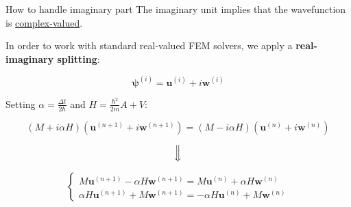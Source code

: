 \begin{frame}{How to handle imaginary part}
    The imaginary unit implies that the wavefunction is \underline{complex-valued}.

    \pause

    In order to work with standard real-valued FEM solvers, we apply a \textcolor{BrickRed}{\textbf{real-imaginary splitting}}:

    \begin{equation*}
        \boldsymbol{\psi}^{(i)}=\boldsymbol{u}^{(i)}+i\boldsymbol{w}^{(i)}
    \end{equation*}

    \pause

    Setting $\alpha=\frac{\Delta t}{2\hbar}$ and $H=\frac{\hbar^2}{2m}A+V$:

    \begin{equation*}
        \left(M+i\alpha H\right)\left(\boldsymbol{u}^{(n+1)}+i\boldsymbol{w}^{(n+1)}\right)=\left(M-i\alpha H\right)\left(\boldsymbol{u}^{(n)}+i\boldsymbol{w}^{(n)}\right)
    \end{equation*}

    \pause

    \begin{equation*}
        \Big\Downarrow
    \end{equation*}

    \begin{equation*}
        \begin{cases}
            M\boldsymbol{u}^{(n+1)}-\alpha H\boldsymbol{w}^{(n+1)}=M\boldsymbol{u}^{(n)}+\alpha H\boldsymbol{w}^{(n)}\\
            \alpha H\boldsymbol{u}^{(n+1)}+M\boldsymbol{w}^{(n+1)}=-\alpha H\boldsymbol{u}^{(n)}+M\boldsymbol{w}^{(n)}
        \end{cases}
    \end{equation*}
\end{frame}

